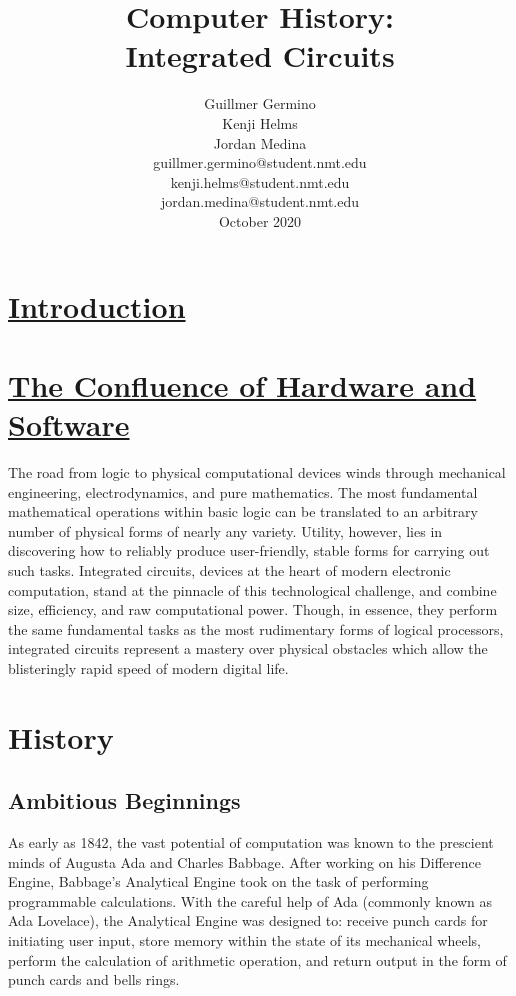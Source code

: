 \documentclass[letterpaper, 10 pt, conference]{IEEEconf}
\title{\LARGE \bf
Computer History:\\Integrated Circuits
}
\author{Guillmer Germino\\Kenji Helms\\Jordan Medina\\
\small guillmer.germino@student.nmt.edu\\
\small kenji.helms@student.nmt.edu\\
\small jordan.medina@student.nmt.edu\\
\small {October 2020}
}
\begin{document}
\maketitle

\section{\underline{Introduction}\\\\
\small {\underline{The Confluence of Hardware and Software}}}
The road from logic to physical computational devices winds through mechanical engineering, electrodynamics, and pure mathematics. The most fundamental mathematical operations within basic logic can be translated to an arbitrary number of physical forms of nearly any  variety. Utility, however, lies in discovering how to reliably produce user-friendly, stable forms for carrying out such tasks. Integrated circuits, devices at the heart of modern electronic computation, stand at the pinnacle of this technological challenge, and combine size, efficiency, and raw computational power. Though, in essence, they perform the same fundamental tasks as the most rudimentary forms of logical processors, integrated circuits represent a mastery over physical obstacles which allow the blisteringly rapid speed of modern digital life.


\section{History}
\subsection{Ambitious Beginnings}

As early as 1842, the vast potential of computation was known to the prescient minds of Augusta Ada and Charles Babbage. After working on his Difference Engine, Babbage's Analytical Engine took on the task of performing programmable calculations. With the careful help of Ada (commonly known as Ada Lovelace), the Analytical Engine was designed to: receive punch cards for initiating user input, store memory within the state of its mechanical wheels, perform the calculation of arithmetic operation, and return output in the form of punch cards and bells rings. 
\end{document}
